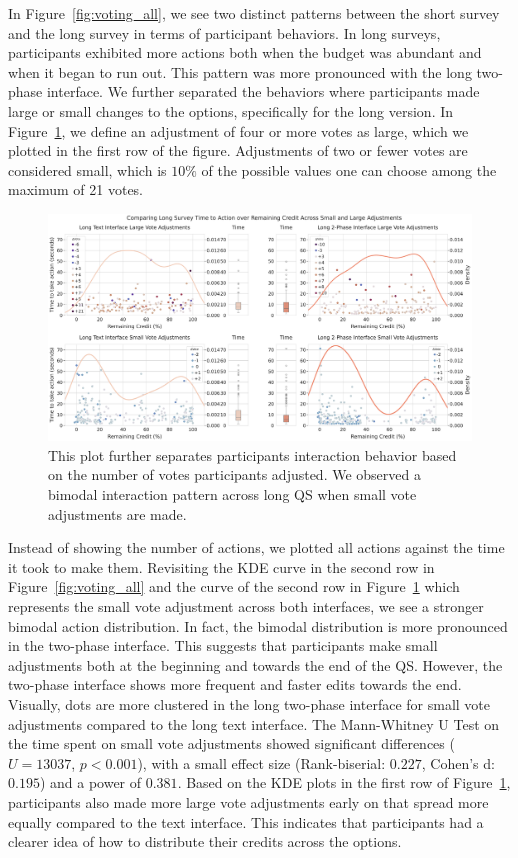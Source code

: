 In Figure~\ref{fig:voting_all}, we see two distinct patterns between the short survey and the long survey in terms of participant behaviors. In long surveys, participants exhibited more actions both when the budget was abundant and when it began to run out. This pattern was more pronounced with the long two-phase interface. We further separated the behaviors where participants made large or small changes to the options, specifically for the long version. In Figure~\ref{fig:voting_v3_v4}, we define an adjustment of four or more votes as large, which we plotted in the first row of the figure. Adjustments of two or fewer votes are considered small, which is $10\%$ of the possible values one can choose among the maximum of 21 votes.

\begin{figure}[ht]
    \centering
    \includegraphics[width=\textwidth]{content/image/results/combined_density_plots.pdf}
    \caption{This plot further separates participants interaction behavior based on the number of votes participants adjusted. We observed a bimodal interaction pattern across long QS when small vote adjustments are made.}
    \label{fig:voting_v3_v4}
\end{figure}

Instead of showing the number of actions, we plotted all actions against the time it took to make them. Revisiting the KDE curve in the second row in Figure~\ref{fig:voting_all} and the curve of the second row in Figure~\ref{fig:voting_v3_v4} which represents the small vote adjustment across both interfaces, we see a stronger bimodal action distribution. In fact, the bimodal distribution is more pronounced in the two-phase interface. This suggests that participants make small adjustments both at the beginning and towards the end of the QS. However, the two-phase interface shows more frequent and faster edits towards the end. Visually, dots are more clustered in the long two-phase interface for small vote adjustments compared to the long text interface. The Mann-Whitney U Test on the time spent on small vote adjustments showed significant differences ($U=13037$, $p<0.001$), with a small effect size (Rank-biserial: $0.227$, Cohen's d: $0.195$) and a power of $0.381$. Based on the KDE plots in the first row of Figure~\ref{fig:voting_v3_v4}, participants also made more large vote adjustments early on that spread more equally compared to the text interface. This indicates that participants had a clearer idea of how to distribute their credits across the options.

